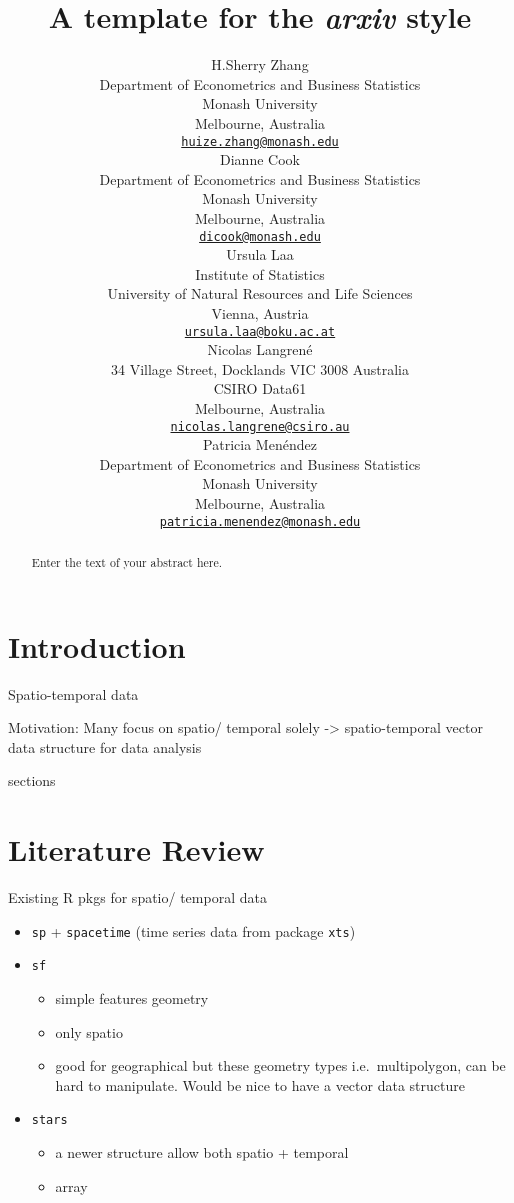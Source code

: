 \documentclass{article}
\title{A template for the \emph{arxiv} style}
\author{
    H.Sherry Zhang
   \\
    Department of Econometrics and Business Statistics \\
    Monash University \\
  Melbourne, Australia \\
  \texttt{\href{mailto:huize.zhang@monash.edu}{\nolinkurl{huize.zhang@monash.edu}}} \\
   \And
    Dianne Cook
   \\
    Department of Econometrics and Business Statistics \\
    Monash University \\
  Melbourne, Australia \\
  \texttt{\href{mailto:dicook@monash.edu}{\nolinkurl{dicook@monash.edu}}} \\
   \And
    Ursula Laa
   \\
    Institute of Statistics \\
    University of Natural Resources and Life Sciences \\
  Vienna, Austria \\
  \texttt{\href{mailto:ursula.laa@boku.ac.at}{\nolinkurl{ursula.laa@boku.ac.at}}} \\
   \And
    Nicolas Langrené
   \\
    34 Village Street, Docklands VIC 3008 Australia \\
    CSIRO Data61 \\
  Melbourne, Australia \\
  \texttt{\href{mailto:nicolas.langrene@csiro.au}{\nolinkurl{nicolas.langrene@csiro.au}}} \\
   \And
    Patricia Menéndez
   \\
    Department of Econometrics and Business Statistics \\
    Monash University \\
  Melbourne, Australia \\
  \texttt{\href{mailto:patricia.menendez@monash.edu}{\nolinkurl{patricia.menendez@monash.edu}}} \\
  }
\begin{document}
\maketitle

\def\tightlist{}


\begin{abstract}
Enter the text of your abstract here.
\end{abstract}


\hypertarget{introduction}{%
\section{Introduction}\label{introduction}}

Spatio-temporal data

Motivation: Many focus on spatio/ temporal solely -\textgreater{}
spatio-temporal vector data structure for data analysis

sections

\hypertarget{literature-review}{%
\section{Literature Review}\label{literature-review}}

Existing R pkgs for spatio/ temporal data

\begin{itemize}
\item
  \texttt{sp} + \texttt{spacetime} (time series data from package
  \texttt{xts})
\item
  \texttt{sf}

  \begin{itemize}
  \tightlist
  \item
    simple features geometry
  \item
    only spatio
  \item
    good for geographical but these geometry types i.e.~multipolygon,
    can be hard to manipulate. Would be nice to have a vector data
    structure
  \end{itemize}
\item
  \texttt{stars}

  \begin{itemize}
  \tightlist
  \item
    a newer structure allow both spatio + temporal
  \item
    array
  \end{itemize}
\end{itemize}
\end{document}
